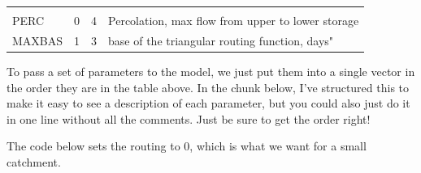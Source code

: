 \documentclass[
]{book}
\begin{document}
\begin{longtable}[]{@{}llll@{}}
\begin{minipage}[t]{0.31\columnwidth}
\end{minipage}\tabularnewline
\begin{minipage}[t]{0.29\columnwidth}\raggedright
PERC\strut
\end{minipage} & \begin{minipage}[t]{0.16\columnwidth}\raggedright
0\strut
\end{minipage} & \begin{minipage}[t]{0.13\columnwidth}\raggedright
4\strut
\end{minipage} & \begin{minipage}[t]{0.31\columnwidth}\raggedright
Percolation, max flow from upper to lower storage\strut
\end{minipage}\tabularnewline
\begin{minipage}[t]{0.29\columnwidth}\raggedright
MAXBAS\strut
\end{minipage} & \begin{minipage}[t]{0.16\columnwidth}\raggedright
1\strut
\end{minipage} & \begin{minipage}[t]{0.13\columnwidth}\raggedright
3\strut
\end{minipage} & \begin{minipage}[t]{0.31\columnwidth}\raggedright
base of the triangular routing function, days"\strut
\end{minipage}\tabularnewline
\bottomrule
\end{longtable}

To pass a set of parameters to the model, we just put them into a single vector in the order they are in the table above. In the chunk below, I've structured this to make it easy to see a description of each parameter, but you could also just do it in one line without all the comments. Just be sure to get the order right!

The code below sets the routing to 0, which is what we want for a small catchment.
\end{document}

